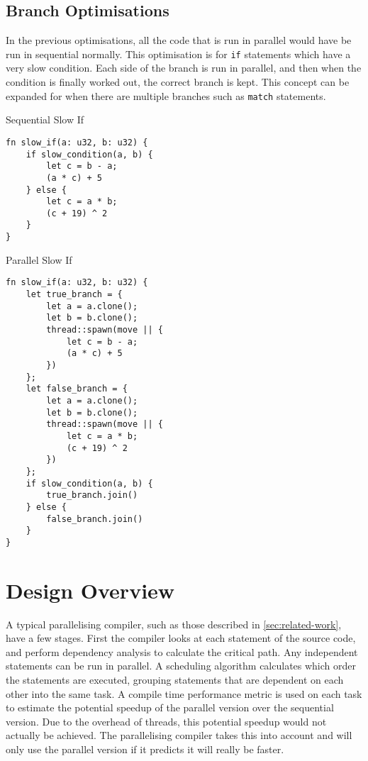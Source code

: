 \documentclass[conference]{IEEEtran}
\begin{document}
\subsection{Branch Optimisations}
In the previous optimisations, all the code that is run in parallel would have be run in sequential normally. This optimisation is for \texttt{if} statements which have a very slow condition. Each side of the branch is run in parallel, and then when the condition is finally worked out, the correct branch is kept. This concept can be expanded for when there are multiple branches such as \texttt{match} statements.


\begin{algorithm}
\caption{Sequential Slow If}
\label{code:seq-slowif}
\begin{verbatim}
fn slow_if(a: u32, b: u32) {
    if slow_condition(a, b) {
        let c = b - a;
        (a * c) + 5
    } else {
        let c = a * b;
        (c + 19) ^ 2
    }
}
\end{verbatim}
\end{algorithm}

\begin{algorithm}
\caption{Parallel Slow If}
\label{code:par-slowif}
\begin{verbatim}
fn slow_if(a: u32, b: u32) {
    let true_branch = {
        let a = a.clone();
        let b = b.clone();
        thread::spawn(move || {
            let c = b - a;
            (a * c) + 5
        })
    };
    let false_branch = {
        let a = a.clone();
        let b = b.clone();
        thread::spawn(move || {
            let c = a * b;
            (c + 19) ^ 2
        })
    };
    if slow_condition(a, b) {
        true_branch.join()
    } else {
        false_branch.join()
    }
}

\end{verbatim}
\end{algorithm}

\section{Design Overview}
A typical parallelising compiler, such as those described in \autoref{sec:related-work}, have a few stages. First the compiler looks at each statement of the source code, and perform dependency analysis to calculate the critical path. Any independent statements can be run in parallel. A scheduling algorithm calculates which order the statements are executed, grouping statements that are dependent on each other into the same task. A compile time performance metric is used on each task to estimate the potential speedup of the parallel version over the sequential version. Due to the overhead of threads, this potential speedup would not actually be achieved. The parallelising compiler takes this into account and will only use the parallel version if it predicts it will really be faster.
\end{document}

